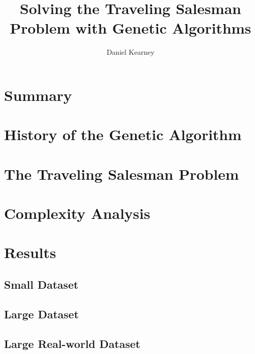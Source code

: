 \documentclass[UTF8]{report}
\begin{document}
\title{%
  Solving the Traveling Salesman Problem with Genetic Algorithms 
}

\author{Daniel Kearney}

\maketitle

\tableofcontents
\pagebreak

\section{Summary}

\section{History of the Genetic Algorithm}

\section{The Traveling Salesman Problem}





\section{Complexity Analysis}

\section{Results}

\subsection{Small Dataset}

\subsection{Large Dataset}

\subsection{Large Real-world Dataset}
\end{document}

